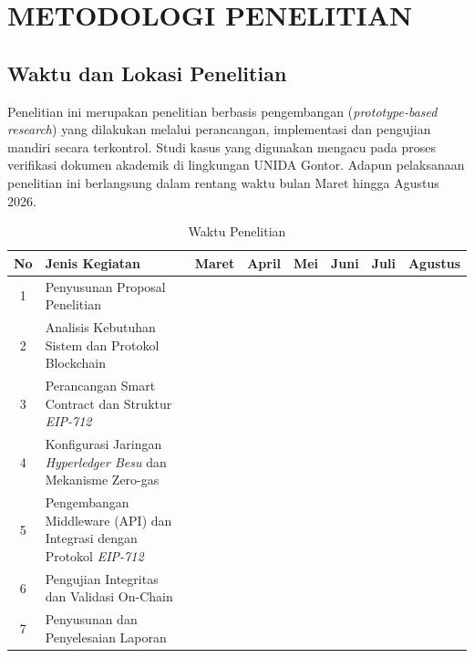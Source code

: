 \chapter{METODOLOGI PENELITIAN}	
	\section{Waktu dan Lokasi Penelitian}
	\setlength{\leftskip}{0.7cm}
	Penelitian ini merupakan penelitian berbasis pengembangan (\textit{prototype-based research}) yang dilakukan melalui perancangan, implementasi dan pengujian mandiri secara terkontrol. Studi kasus yang digunakan mengacu pada proses verifikasi dokumen akademik di lingkungan UNIDA Gontor. Adapun pelaksanaan penelitian ini berlangsung dalam rentang waktu bulan Maret hingga Agustus 2026.
		
	\begin{table}[ht]
		\centering
		\caption{Waktu Penelitian}
		\renewcommand{\arraystretch}{2}

		\begin{tabular}{|c|p{4cm}|c|c|c|c|c|c|}
			\hline
			\textbf{No} &
			\textbf{Jenis Kegiatan} &
			\textbf{Maret} &
			\textbf{April} &
			\textbf{Mei} &
			\textbf{Juni} &
			\textbf{Juli} &
			\textbf{Agustus} \\ \hline		

			1 &
			Penyusunan Proposal Penelitian &
			\cellcolor{blue!70} &
			\cellcolor{blue!70} &
			&
			&
			&
			\\ \hline

			2 &
			Analisis Kebutuhan Sistem dan Protokol Blockchain &
			&
			\cellcolor{blue!70} &
			&
			&
			&
			\\ \hline

			3 &
			Perancangan Smart Contract dan Struktur \textit{EIP-712} &
			&
			\cellcolor{blue!70} &
			\cellcolor{blue!70} &
			&
			&
			\\ \hline

			4 &
			Konfigurasi Jaringan \textit{Hyperledger Besu} dan Mekanisme Zero-gas &
			&
			&
			\cellcolor{blue!70} &
			\cellcolor{blue!70} &
			&
			\\ \hline

			5 &
			Pengembangan Middleware (API) dan Integrasi dengan Protokol \textit{EIP-712} &
			&
			&
			&
			\cellcolor{blue!70} &
			\cellcolor{blue!70} &
			\\ \hline

			6 &
			Pengujian Integritas dan Validasi On-Chain &
			&
			&
			&
			&
			\cellcolor{blue!70} &
			\\ \hline

			7 &
			Penyusunan dan Penyelesaian Laporan &
			&
			&
			&
			&
			\cellcolor{blue!70} &
			\cellcolor{blue!70}
			\\ \hline
		\end{tabular}
	\end{table}

